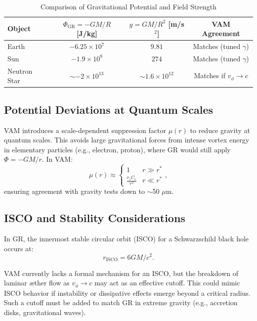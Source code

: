 \documentclass[a4paper, aps,preprint,superscriptaddress, 12pt]{revtex4}
\begin{document}
\begin{table}[H]
    \centering
    \caption{Comparison of Gravitational Potential and Field Strength}
    \begin{tabular}{lccc}
        \toprule
        Object & $\Phi_\text{GR} = -GM/R$ [J/kg] & $g = GM/R^2$ [m/s$^2$] & VAM Agreement \\
        \midrule
        Earth & $-6.25\times10^7$ & $9.81$ & Matches (tuned $\gamma$) \\
        Sun & $-1.9\times10^8$ & $274$ & Matches (tuned $\gamma$) \\
        Neutron Star & $\sim -2\times10^{13}$ & $\sim 1.6\times10^{12}$ & Matches if $v_\phi \rightarrow c$ \\
        \bottomrule
    \end{tabular}
\end{table}

\subsection{Potential Deviations at Quantum Scales}
VAM introduces a scale-dependent suppression factor $\mu(r)$ to reduce gravity at quantum scales. This avoids large gravitational forces from intense vortex energy in elementary particles (e.g., electron, proton), where GR would still apply $\Phi = -GM/r$. In VAM:
\begin{equation}
    \mu(r) \approx \begin{cases}
                       1 & r \gg r^* \\
                       \frac{r_c C_e}{r^2} & r \ll r^*
    \end{cases},
\end{equation}
ensuring agreement with gravity tests down to $\sim$50 $\mu$m.

\subsection{ISCO and Stability Considerations}
In GR, the innermost stable circular orbit (ISCO) for a Schwarzschild black hole occurs at:
\begin{equation}
    r_\text{ISCO} = 6GM/c^2.
\end{equation}

VAM currently lacks a formal mechanism for an ISCO, but the breakdown of laminar æther flow as $v_\phi \rightarrow c$ may act as an effective cutoff. This could mimic ISCO behavior if instability or dissipative effects emerge beyond a critical radius. Such a cutoff must be added to match GR in extreme gravity (e.g., accretion disks, gravitational waves).
\end{document}
